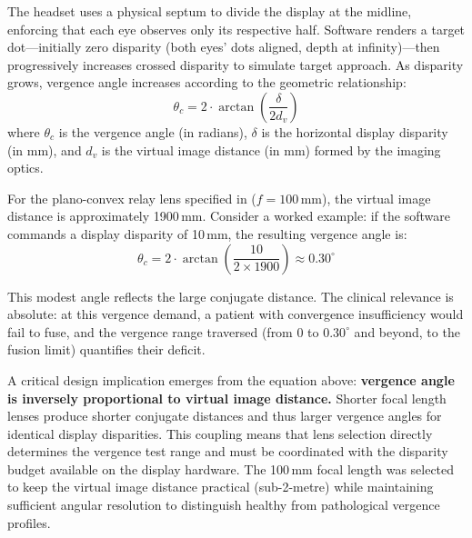 The headset uses a physical septum to divide the display at the midline, enforcing that each eye observes only its respective half. Software renders a target dot---initially zero disparity (both eyes' dots aligned, depth at infinity)---then progressively increases crossed disparity to simulate target approach. As disparity grows, vergence angle increases according to the geometric relationship:
%
\begin{equation}
    \theta_c = 2 \cdot \arctan\left(\frac{\delta}{2 d_v}\right)
\end{equation}
%
where $\theta_c$ is the vergence angle (in radians), $\delta$ is the horizontal display disparity (in mm), and $d_v$ is the virtual image distance (in mm) formed by the imaging optics.

For the plano-convex relay lens specified in  ($f = 100$\,mm), the virtual image distance is approximately 1900\,mm. Consider a worked example: if the software commands a display disparity of 10\,mm, the resulting vergence angle is:
%
\begin{equation}
    \theta_c = 2 \cdot \arctan\left(\frac{10}{2 \times 1900}\right) \approx 0.30^{\circ}
\end{equation}

This modest angle reflects the large conjugate distance. The clinical relevance is absolute: at this vergence demand, a patient with convergence insufficiency would fail to fuse, and the vergence range traversed (from 0 to $0.30^{\circ}$ and beyond, to the fusion limit) quantifies their deficit.

A critical design implication emerges from the equation above: \textbf{vergence angle is inversely proportional to virtual image distance.} Shorter focal length lenses produce shorter conjugate distances and thus larger vergence angles for identical display disparities. This coupling means that lens selection directly determines the vergence test range and must be coordinated with the disparity budget available on the display hardware. The 100\,mm focal length was selected to keep the virtual image distance practical (sub-2-metre) while maintaining sufficient angular resolution to distinguish healthy from pathological vergence profiles.



